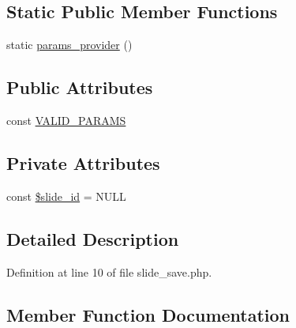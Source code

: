 \subsection*{Static Public Member Functions}
\begin{DoxyCompactItemize}
\item 
static \hyperlink{classlibresignage_1_1tests_1_1api_1_1endpoint_1_1slide_1_1slide__save_aff65354406e056679bb7a1f7f0e6105e}{params\+\_\+provider} ()
\end{DoxyCompactItemize}
\subsection*{Public Attributes}
\begin{DoxyCompactItemize}
\item 
const \hyperlink{classlibresignage_1_1tests_1_1api_1_1endpoint_1_1slide_1_1slide__save_a13beb61c399be71eb4671feb8e96622c}{V\+A\+L\+I\+D\+\_\+\+P\+A\+R\+A\+MS}
\end{DoxyCompactItemize}
\subsection*{Private Attributes}
\begin{DoxyCompactItemize}
\item 
const \hyperlink{classlibresignage_1_1tests_1_1api_1_1endpoint_1_1slide_1_1slide__save_abb61b4aa40b6d651c2d7056938aa9b06}{\$slide\+\_\+id} = N\+U\+LL
\end{DoxyCompactItemize}


\subsection{Detailed Description}


Definition at line 10 of file slide\+\_\+save.\+php.



\subsection{Member Function Documentation}
\mbox{\label{classlibresignage_1_1tests_1_1api_1_1endpoint_1_1slide_1_1slide__save_aff65354406e056679bb7a1f7f0e6105e}} 
